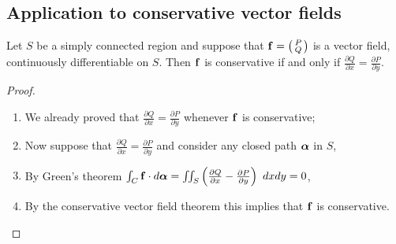 


\subsection{Application to conservative vector fields}


\begin{theorem}
    Let \(S\) be a simply connected region and suppose that \(\mathbf{f} = \left(\begin{smallmatrix}
            P \\ Q
        \end{smallmatrix}\right)\)
    is a vector field, continuously differentiable on \(S\).
    Then \(\mathbf{f}\) is conservative if and only if \(\tfrac{\partial Q}{\partial x} = \tfrac{\partial P}{\partial y}\).
\end{theorem}

\begin{proof}
    \begin{enumerate}
        \item We already proved that \(\tfrac{\partial Q}{\partial x} = \tfrac{\partial P}{\partial y}\) whenever \(\mathbf{f}\) is conservative;
        \item Now suppose that  \(\tfrac{\partial Q}{\partial x} = \tfrac{\partial P}{\partial y}\) and consider any closed path \(\boldsymbol{\alpha}\) in \(S\),
        \item By Green's theorem \(\int_{C} \mathbf{f} \cdot d\boldsymbol{\alpha} = \iint_{S} \left(\tfrac{\partial Q}{\partial x} - \tfrac{\partial P}{\partial y}\right) \ dxdy = 0\),
        \item By the conservative vector field theorem this implies that \(\mathbf{f}\) is conservative.
    \end{enumerate}
\end{proof}

